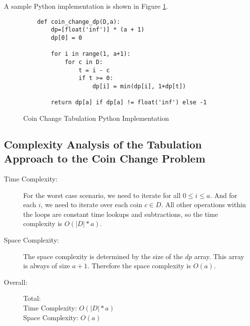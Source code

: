 A sample Python implementation is shown in Figure \ref{fig:coin-change-dp}.

\begin{figure}[H]
    \centering
    \begin{lstlisting}
    def coin_change_dp(D,a):
        dp=[float('inf')] * (a + 1)
        dp[0] = 0
    
        for i in range(1, a+1):
            for c in D:
                t = i - c
                if t >= 0:
                    dp[i] = min(dp[i], 1+dp[t])
    
        return dp[a] if dp[a] != float('inf') else -1
    \end{lstlisting}
    \caption{Coin Change Tabulation Python Implementation}
    \label{fig:coin-change-dp}
\end{figure}

\subsection{Complexity Analysis of the Tabulation Approach to the Coin Change Problem}

\begin{description}
    \item[Time Complexity:]
        For the worst case scenario, we need to iterate for all $0 \leq i \leq a$.
        And for each $i$, we need to iterate over each coin $c \in D$.
        All other operations within the loops are constant time lookups and subtractions, so the time complexity is $O(|D| * a)$.
            
    \item[Space Complexity:] 
        The space complexity is determined by the size of the $dp$ array. This array is always of size $a+1$.
        Therefore the space complexity is $O(a)$.
        
    \item[Overall:] Total:\\
        Time Complexity: $O(|D| * a)$\\
        Space Complexity: $O(a)$
        
\end{description}